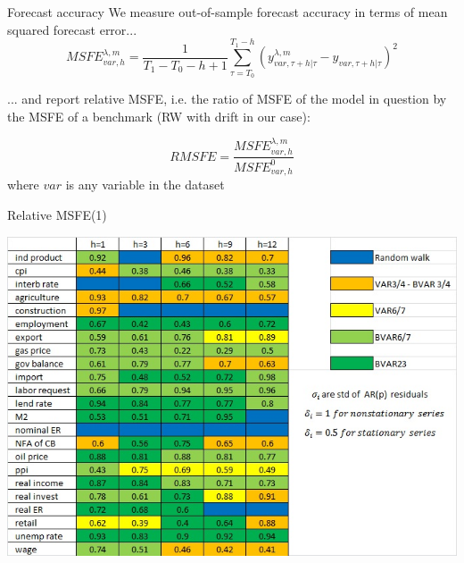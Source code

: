 \documentclass{beamer} %
\begin{document}
\begin{frame}{Forecast accuracy}
We measure out-of-sample forecast accuracy in terms of mean squared forecast error... 
\begin{equation}
MSFE_{var,h}^{\lambda,m}=\frac{1}{T_1-T_0-h+1}\sum_{\tau=T_0}^{T_1-h} (y_{var,\tau+h|\tau}^{\lambda,m}-y_{var,\tau+h|\tau})^2
\end{equation}

... and report relative MSFE, i.e. the ratio of MSFE of the model in question by the MSFE of a benchmark (RW with drift in our case): 

\begin{equation}
RMSFE=\frac{MSFE_{var,h}^{\lambda,m}}{MSFE_{var,h}^0}
\end{equation}
where $var$ is any variable in the dataset
\end{frame}


\begin{frame}{Relative MSFE(1)} %
\vspace{-5mm}
\begin{center}
\includegraphics[scale=0.60]{hyper3.jpg}
\end{center}
\end{frame}
\end{document}
